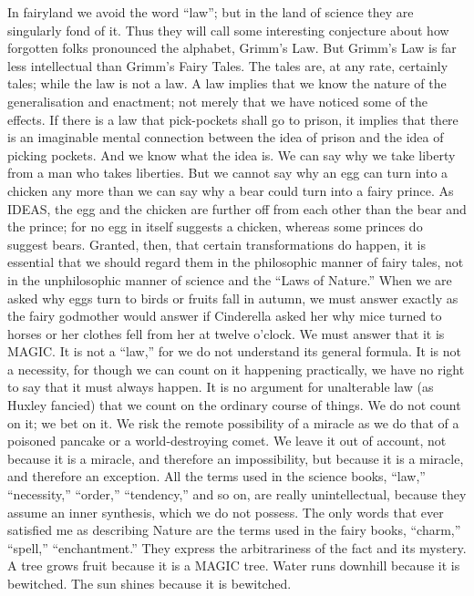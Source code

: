 In fairyland we avoid the word “law”; but in the land of science they are singularly fond of it. Thus they will call some interesting conjecture about how forgotten folks pronounced the alphabet, Grimm’s Law. But Grimm’s Law is far less intellectual than Grimm’s Fairy Tales. The tales are, at any rate, certainly tales; while the law is not a law. A law implies that we know the nature of the generalisation and enactment; not merely that we have noticed some of the effects. If there is a law that pick-pockets shall go to prison, it implies that there is an imaginable mental connection between the idea of prison and the idea of picking pockets. And we know what the idea is. We can say why we take liberty from a man who takes liberties. But we cannot say why an egg can turn into a chicken any more than we can say why a bear could turn into a fairy prince. As IDEAS, the egg and the chicken are further off from each other than the bear and the prince; for no egg in itself suggests a chicken, whereas some princes do suggest bears. Granted, then, that certain transformations do happen, it is essential that we should regard them in the philosophic manner of fairy tales, not in the unphilosophic manner of science and the “Laws of Nature.” When we are asked why eggs turn to birds or fruits fall in autumn, we must answer exactly as the fairy godmother would answer if Cinderella asked her why mice turned to horses or her clothes fell from her at twelve o’clock. We must answer that it is MAGIC. It is not a “law,” for we do not understand its general formula. It is not a necessity, for though we can count on it happening practically, we have no right to say that it must always happen. It is no argument for unalterable law (as Huxley fancied) that we count on the ordinary course of things. We do not count on it; we bet on it. We risk the remote possibility of a miracle as we do that of a poisoned pancake or a world-destroying comet. We leave it out of account, not because it is a miracle, and therefore an impossibility, but because it is a miracle, and therefore an exception. All the terms used in the science books, “law,” “necessity,” “order,” “tendency,” and so on, are really unintellectual, because they assume an inner synthesis, which we do not possess. The only words that ever satisfied me as describing Nature are the terms used in the fairy books, “charm,” “spell,” “enchantment.” They express the arbitrariness of the fact and its mystery. A tree grows fruit because it is a MAGIC tree. Water runs downhill because it is bewitched. The sun shines because it is bewitched.

